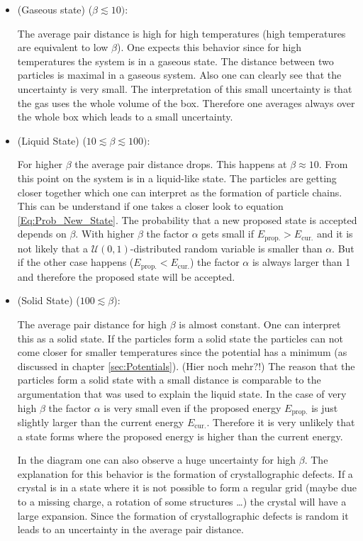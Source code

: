 \documentclass[11pt, a4paper]{article}
\numberwithin{equation}{section}
\newcommand{\remark}[1]{{\color{red}(#1)}}
\begin{document}
\begin{itemize}
\item{\remark{Gaseous state} ($\beta \lesssim 10)$:}

The average pair distance is high for high temperatures (high temperatures are equivalent to low $\beta$).
One expects this behavior since for high temperatures the system is in a gaseous state.
The distance between two particles is maximal in a gaseous system.
Also one can clearly see that the uncertainty is very small.
The interpretation of this small uncertainty is that the gas uses the whole volume of the box.
Therefore one averages always over the whole box which leads to a small uncertainty.

\item{\remark{Liquid State} ($10 \lesssim \beta \lesssim 100)$:}

For higher $\beta$ the average pair distance drops.
This happens at $\beta \approx 10$.
From this point on the system is in a liquid-like state.
The particles are getting closer together which one can interpret as the formation of particle chains.
This can be understand if one takes a closer look to equation \ref{Eq:Prob_New_State}.
The probability that a new proposed state is accepted depends on $\beta$.
With higher $\beta$ the factor $\alpha$ gets small if $E_\mathrm{prop.} > E_\mathrm{cur.}$ and it is not likely that a $\mathcal{U}(0, 1)$-distributed random variable is smaller than $\alpha$.
But if the other case happens ($E_\mathrm{prop.} < E_\mathrm{cur.}$) the factor $\alpha$ is always larger than 1 and therefore the proposed state will be accepted.

\item{\remark{Solid State} ($100 \lesssim \beta$):}

The average pair distance for high $\beta$ is almost constant.
One can interpret this as a solid state.
If the particles form a solid state the particles can not come closer for smaller temperatures since the potential has a minimum (as discussed in chapter \ref{sec:Potentials}). \remark{Hier noch mehr?!}
The reason that the particles form a solid state with a small distance is comparable to the argumentation that was used to explain the liquid state.
In the case of very high $\beta$ the factor $\alpha$ is very small even if the proposed energy $E_\mathrm{prop.}$ is just slightly larger than the current energy $E_\mathrm{cur.}$.
Therefore it is very unlikely that a state forms where the proposed energy is higher than the current energy.

In the diagram one can also observe a huge uncertainty for high $\beta$.
The explanation for this behavior is the formation of crystallographic defects.
If a crystal is in a state where it is not possible to form a regular grid (maybe due to a missing charge, a rotation of some structures \dots) the crystal will have a large expansion.
Since the formation of crystallographic defects is random it leads to an uncertainty in the average pair distance.
\end{itemize}
\end{document}
